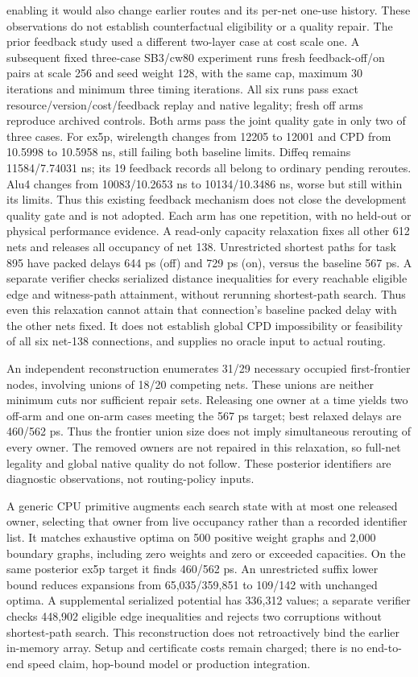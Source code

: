 \documentclass[10pt]{article}
\begin{document}
enabling it would also change earlier routes and its per-net one-use
history. These observations do not establish counterfactual eligibility
or a quality repair. The prior feedback study used a different two-layer
case at cost scale one.
A subsequent fixed three-case SB3/cw80 experiment runs fresh feedback-off/on
pairs at scale 256 and seed weight 128, with the same cap, maximum 30
iterations and minimum three timing iterations. All six runs pass exact
resource/version/cost/feedback replay and native legality; fresh off arms
reproduce archived controls. Both arms pass the joint quality gate in
only two of three cases. For ex5p, wirelength changes from 12205 to 12001
and CPD from 10.5998 to 10.5958 ns, still failing both baseline limits.
Diffeq remains 11584/7.74031 ns; its 19 feedback records all belong to
ordinary pending reroutes. Alu4 changes from 10083/10.2653 ns to
10134/10.3486 ns, worse but still within its limits. Thus this existing
feedback mechanism does not close the development quality gate and is
not adopted. Each arm has one repetition, with no held-out or physical
performance evidence.
A read-only capacity relaxation fixes all other 612 nets and releases all
occupancy of net 138. Unrestricted shortest paths for task 895 have
packed delays 644 ps (off) and 729 ps (on), versus the baseline 567 ps.
A separate verifier checks serialized distance inequalities for every
reachable eligible edge and witness-path attainment, without rerunning
shortest-path search. Thus even this relaxation cannot attain that
connection's baseline packed delay with the other nets fixed. It does
not establish global CPD impossibility or feasibility of all six net-138
connections, and supplies no oracle input to actual routing.

An independent reconstruction enumerates 31/29 necessary occupied
first-frontier nodes, involving unions of 18/20 competing nets. These
unions are neither minimum cuts nor sufficient repair sets. Releasing
one owner at a time yields two off-arm and one on-arm cases meeting
the 567 ps target; best relaxed delays are 460/562 ps. Thus the frontier
union size does not imply simultaneous rerouting of every owner. The
removed owners are not repaired in this relaxation, so full-net legality
and global native quality do not follow. These posterior identifiers
are diagnostic observations, not routing-policy inputs.

A generic CPU primitive augments each search state with at most one
released owner, selecting that owner from live occupancy rather than a
recorded identifier list. It matches exhaustive optima on 500 positive
weight graphs and 2,000 boundary graphs, including zero weights and
zero or exceeded capacities. On the same posterior ex5p target it finds
460/562 ps. An unrestricted suffix lower bound reduces expansions from
65,035/359,851 to 109/142 with unchanged optima. A supplemental serialized
potential has 336,312 values; a separate verifier checks 448,902 eligible
edge inequalities and rejects two corruptions without shortest-path
search. This reconstruction does not retroactively bind the earlier
in-memory array. Setup and certificate costs remain charged; there is
no end-to-end speed claim, hop-bound model or production integration.
\end{document}
